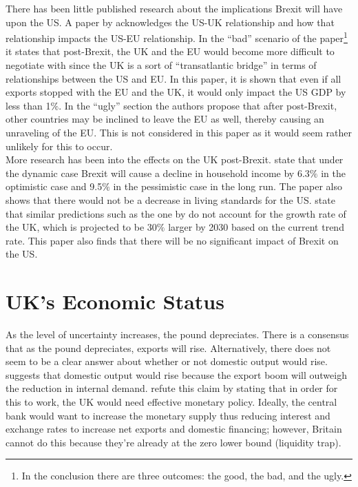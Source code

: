 \documentclass[12pt]{article}
\begin{document}
There has been little published research about the implications Brexit will have upon the US. A paper by \citet{olivwill:2016} acknowledges the US-UK relationship and how that relationship impacts the US-EU relationship. In the ``bad'' scenario of the paper\footnote{In the conclusion there are three outcomes: the good, the bad, and the ugly.} it states that post-Brexit, the UK and the EU would become more difficult to negotiate with since the UK is a sort of ``transatlantic bridge'' in terms of relationships between the US and EU. In this paper, it is shown that even if all exports stopped with the EU and the UK, it would only impact the US GDP by less than 1$\%$. In the ``ugly'' section the authors propose that after post-Brexit, other countries may be inclined to leave the EU as well, thereby causing an unraveling of the EU. This is not considered in this paper as it would seem rather unlikely for this to occur.\\

More research has been into the effects on the UK post-Brexit. \citet{dhinetal:2016} state that under the dynamic case Brexit will cause a decline in household income by 6.3$\%$ in the optimistic case and 9.5$\%$ in the pessimistic case in the long run. The paper also shows that there would not be a decrease in living standards for the US. \citet{begg:2016} state that similar predictions such as the one by \citet{dhinetal:2016} do not account for the growth rate of the UK, which is projected to be 30$\%$ larger by 2030 based on the current trend rate. This paper also finds that there will be no significant impact of Brexit on the US.     

\section{UK's Economic Status}
As the level of uncertainty increases, the pound depreciates. There is a consensus that as the pound depreciates, exports will rise. Alternatively, there does not seem to be a clear answer about whether or not domestic output would rise. \citet{krugman:2014} suggests that domestic output would rise because the export boom will outweigh the reduction in internal demand. \citet{corsmuel:2016} refute this claim by stating that in order for this to work, the UK would need effective monetary policy. Ideally, the central bank would want to increase the monetary supply thus reducing interest and exchange rates to increase net exports and domestic financing; however, Britain cannot do this because they're already at the zero lower bound (liquidity trap).\\ 
\end{document}

